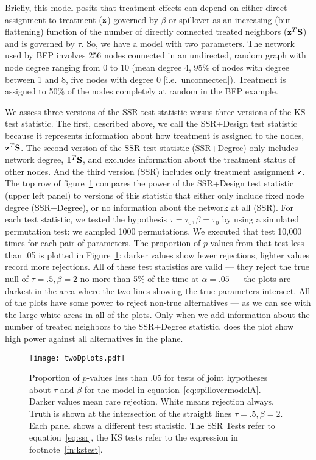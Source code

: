 Briefly, this model posits that treatment effects can depend on either direct
assignment to treatment ($\mathbf{z}$) governed by $\beta$ or spillover as an
increasing (but flattening) function of the number of directly connected
treated neighbors ($\mathbf{z}^{T} \mathbf{S}$) and is governed by $\tau$. So, we have a
model with two parameters. The network used by BFP involves 256 nodes
connected in an undirected, random graph with node degree ranging from 0 to 10
(mean degree 4, 95\% of nodes with degree between 1 and 8, five nodes with
degree 0 [i.e.\ unconnected]).  Treatment is assigned to 50\% of the nodes 
completely at random in the BFP example.

We assess three versions of the SSR test statistic versus three versions of
the KS test statistic. The first, described above, we call the SSR+Design test
statistic because it represents information about how treatment is assigned to
the nodes, $\mathbf{z}^T \mathbf{S}$. The second version of
the SSR test statistic (SSR+Degree) only includes network degree,  $\mathbf{1}^T \mathbf{S}$, and
excludes information about the treatment status of other nodes. And the
third version (SSR) includes only treatment assignment $\mathbf{z}$. The top row of
figure~\ref{fig:twoD} compares the power of the SSR+Design test statistic
(upper left panel) to versions of this statistic that either only include
fixed node degree (SSR+Degree), or no information about the network at all
(SSR). For each test statistic, we tested the hypothesis
$\tau=\tau_0,\beta=\tau_0$ by using a simulated permutation test: we
sampled 1000 permutations. We executed that test
10,000 times for each pair of parameters.  The proportion of $p$-values from
that test less than .05 is plotted in Figure~\ref{fig:twoD}: darker values
show fewer rejections, lighter values record more rejections.  All of these
test statistics are valid --- they reject the true null of $\tau=.5,\beta=2$
no more than 5\% of the time at $\alpha=.05$ --- the plots are darkest in the
area where the two lines showing the true parameters intersect. All of the
plots have some power to reject non-true alternatives --- as we can see with
the large white areas in all of the plots. Only when we add
information about the number of treated neighbors to the SSR+Degree statistic,
does the plot show high power against all alternatives in the plane.


\begin{figure}[h!] \centering
  \texttt{[image: twoDplots.pdf]} \caption{Proportion of
    $p$-values less than .05 for tests of joint hypotheses about $\tau$ and
    $\beta$ for the model in equation~\ref{eq:spillovermodelA}. Darker values
    mean rare rejection. White means rejection always. Truth is shown at the
    intersection of the straight lines  $\tau=.5, \beta=2$. Each panel shows a
    different test statistic. The SSR Tests refer to equation~\ref{eq:ssr},
    the KS tests refer to the expression in
    footnote~\ref{fn:kstest}.}\label{fig:twoD}
\end{figure}

